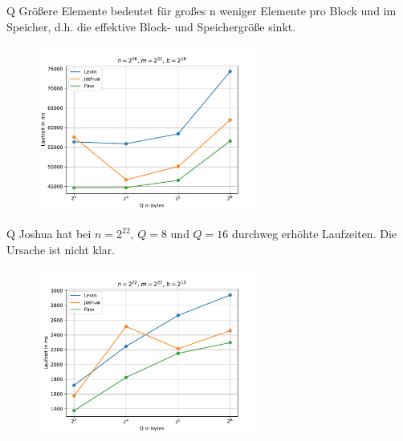 \documentclass[ngerman,aspectratio=169,10pt]{beamer}
\begin{document}
\begin{frame}{Q}
Größere Elemente bedeutet für großes n weniger Elemente pro Block und im Speicher, d.h. die effektive Block- und Speichergröße sinkt.
\vspace{-10pt}
\begin{figure}[H]
    \centering
    \includegraphics[width=0.65\textwidth]{q__n_67108864_m_2097152_b_65536.pdf}
    \label{fig:f3}
\end{figure}
\end{frame}

\begin{frame}{Q}
Joshua hat bei $n=2^{22}$, $Q=8$ und $Q=16$ durchweg erhöhte Laufzeiten. Die Ursache ist nicht klar.
\vspace{-10pt}
\begin{figure}[H]
    \centering
    \includegraphics[width=0.65\textwidth]{q__n_4194304_m_4194304_b_8192.pdf}
    \label{fig:f4}
\end{figure}
\end{frame}
\end{document}
